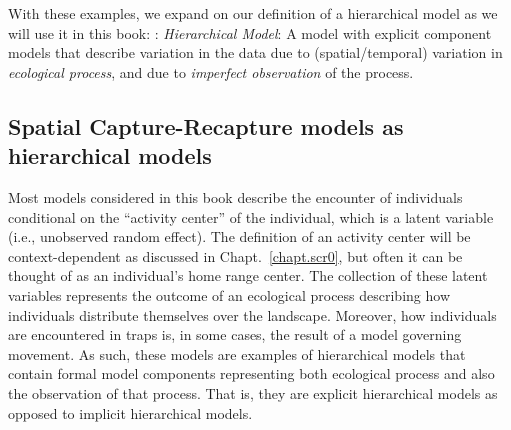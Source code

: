 With these examples,
we expand on our definition of a hierarchical model as we will use it
in this book: \newline
{: {\it Hierarchical Model}: A model with
  explicit component models that describe variation in the data due to
  (spatial/temporal) variation in {\it ecological process}, and due to
  {\it imperfect observation} of the process.
}














\subsection{Spatial Capture-Recapture models as hierarchical models}

Most models considered in this book describe the encounter of
individuals conditional on the ``activity center'' of the individual,
which is a latent variable (i.e., unobserved random effect).
The definition of an activity center will be context-dependent as
discussed in Chapt.~\ref{chapt.scr0}, but
often it can be thought of as an individual's home range center.
The collection of these latent variables represents the outcome of an
ecological process describing how individuals distribute themselves
over the landscape. Moreover, how individuals are encountered in traps
is, in some cases, the result of a model governing movement.  As such,
these models are examples of hierarchical models that contain formal
model components representing both ecological process and also the
observation of that process. That is, they are explicit hierarchical
models \citep{royle_dorazio:2008} as opposed to implicit hierarchical
models.




